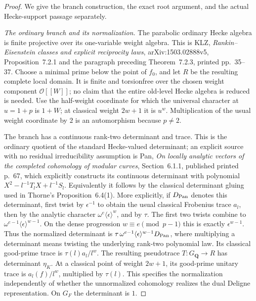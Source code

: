 \begin{proof}
We give the branch construction, the exact root argument, and
the actual Hecke-support passage separately.

\emph{The ordinary branch and its normalization.}
The parabolic ordinary Hecke algebra is finite projective over
its one-variable weight algebra.  This is KLZ,
\emph{Rankin--Eisenstein classes and explicit reciprocity laws},
arXiv:1503.02888v5, Proposition~7.2.1 and the paragraph preceding
Theorem~7.2.3, printed pp.~35--37.
Choose a minimal prime below the point of \(f_0\), and let \(R\)
be the resulting complete local domain.
It is finite and torsionfree over the chosen weight component
\(\mathcal O[[W]]\); no claim that the entire old-level Hecke
algebra is reduced is needed.
Use the half-weight coordinate for which the universal
character at \(u=1+p\) is \(1+W\); at classical weight \(2w+1\)
it is \(u^w\).
Multiplication of the usual weight coordinate by \(2\) is an
automorphism because \(p\ne2\).

The branch has a continuous rank-two determinant and trace.
This is the ordinary quotient of the standard Hecke-valued
determinant; an explicit source with no residual irreducibility
assumption is Pan, \emph{On locally analytic vectors of the
completed cohomology of modular curves}, Section~6.1.1, published printed p.~67, which explicitly constructs
its continuous determinant with polynomial
\(X^2-l^{-1}T_lX+l^{-1}S_l\).
Equivalently it follows by the classical determinant gluing
used in Thorne's Proposition~6.4(1).
More explicitly, if \(D_{\rm Pan}\) denotes this determinant,
first twist by \(\epsilon^{-1}\) to obtain the usual classical
Frobenius trace \(a_l\), then by the analytic character
\(\omega^{e}\langle\epsilon\rangle^{w}\), and by \(\tau\).
The first two twists combine to
\(\omega^{e-1}\langle\epsilon\rangle^{w-1}\).
On the dense progression \(w\equiv e\pmod{p-1}\) this is
exactly \(\epsilon^{w-1}\).
Thus the normalized determinant is
\(\tau\,\omega^{e-1}\langle\epsilon\rangle^{w-1}D_{\rm Pan}\),
where multiplying a determinant means twisting the underlying
rank-two polynomial law.
Its classical good-prime trace is \(\tau(l)a_l/l^w\).
The resulting
pseudotrace \(T:G_{\mathbf Q}\to R\) has determinant
\(\eta_K\).
At a classical point of weight \(2w+1\), its good-prime
unitary trace is \(a_l(f)/l^w\), multiplied by \(\tau(l)\).
This specifies the normalization independently of whether
the unnormalized cohomology realizes the dual Deligne
representation.
On \(G_F\) the determinant is \(1\).


\end{proof}

